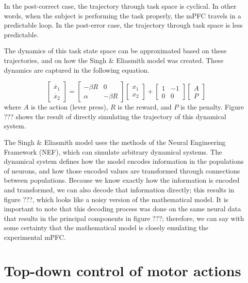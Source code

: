 \documentclass[12pt]{article}
\begin{document}
In the post-correct case,
the trajectory through task space is cyclical.
In other words,
when the subject is performing the task properly,
the mPFC travels in a predictable loop.
In the post-error case,
the trajectory through task space is less predictable.

The dynamics of this task state space
can be approximated based on these trajectories,
and on how the Singh \& Eliasmith model was created.
These dynamics are captured in the following equation.

\begin{equation*}
  \begin{bmatrix}
    \dot{x_1} \\ \dot{x_2}
  \end{bmatrix} = \begin{bmatrix}
    -\beta R & 0 \\ \alpha & -\beta R
  \end{bmatrix} \begin{bmatrix}
    x_1 \\ x_2
  \end{bmatrix} + \begin{bmatrix}
    1 & -1 \\ 0 & 0
  \end{bmatrix} \begin{bmatrix}
    A \\ P
  \end{bmatrix} 
\end{equation*}
where $A$ is the action (lever press),
$R$ is the reward, and $P$ is the penalty.
Figure ??? shows the result of directly simulating
the trajectory of this dynamical system.

The Singh \& Eliasmith model uses the methods
of the Neural Engineering Framework (NEF),
which can simulate arbitrary dynamical systems.
The dynamical system defines how the model
encodes information in the populations of neurons,
and how those encoded values are transformed
through connections between populations.
Because we know exactly how the information
is encoded and transformed, we can also
decode that information directly;
this results in figure ???,
which looks like a noisy version
of the mathematical model.
It is important to note that this decoding process
was done on the same neural data that
results in the principal components in figure ???;
therefore, we can say with some certainty
that the mathematical model is closely emulating
the experimental mPFC.

\section{Top-down control of motor actions}
\end{document}
